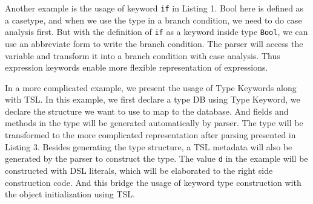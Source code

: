 \documentclass[letterpaper, notitlepage]{article}
\begin{document}
\begin{figure*}[htb!]
\begin{parcolumns}{2}
\end{parcolumns}
\end{figure*}
\par
Another example is the usage of keyword \texttt{if} in Listing 1. Bool here is defined as a casetype, and when we use the type in a branch condition, we need to do case analysis first. But with the definition of \texttt{if} as a keyword inside type \texttt{Bool}, we can use an abbreviate form to write the branch condition. The parser will access the variable and transform it into a branch condition with case analysis. Thus expression keywords enable more flexible representation of expressions.
\par
In a more complicated example, we present the usage of Type Keywords along with TSL. In this example, we first declare a type DB using Type Keyword, we declare the structure we want to use to map to the database. And fields and methods in the type will be generated automatically by parser. The type will be transformed to the more complicated representation after parsing presented in Listing 3. Besides generating the type structure, a TSL metadata will also be generated by the parser to construct the type. The value \texttt{d} in the example will be constructed with DSL literals, which will be elaborated to the right side construction code. And this bridge the usage of keyword type construction with the object initialization using TSL.
\end{document}
